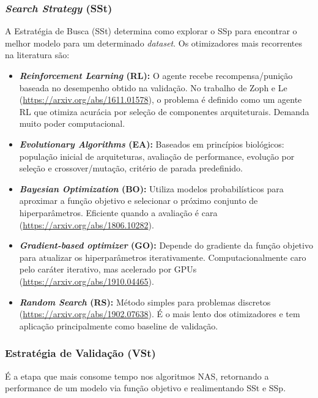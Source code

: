 \documentclass[a4paper,12pt]{article}
\begin{document}
\begin{appendices}
\subsubsection*{\textit{Search Strategy} (SSt)}
A Estratégia de Busca (SSt) determina como explorar o SSp para encontrar o melhor modelo para um determinado \textit{dataset}. Os otimizadores mais recorrentes na literatura são:

\begin{itemize}[noitemsep]
    \item \textbf{\textit{Reinforcement Learning} (RL):} O agente recebe recompensa/punição baseada no desempenho obtido na validação. No trabalho de Zoph e Le (\url{https://arxiv.org/abs/1611.01578}), o problema é definido como um agente RL que otimiza acurácia por seleção de componentes arquiteturais. Demanda muito poder computacional.

    \item \textbf{\textit{Evolutionary Algorithms} (EA):} Baseados em princípios biológicos: população inicial de arquiteturas, avaliação de performance, evolução por seleção e crossover/mutação, critério de parada predefinido.

    \item \textbf{\textit{Bayesian Optimization} (BO):} Utiliza modelos probabilísticos para aproximar a função objetivo e selecionar o próximo conjunto de hiperparâmetros. Eficiente quando a avaliação é cara (\url{https://arxiv.org/abs/1806.10282}).

    \item \textbf{\textit{Gradient-based optimizer} (GO):} Depende do gradiente da função objetivo para atualizar os hiperparâmetros iterativamente. Computacionalmente caro pelo caráter iterativo, mas acelerado por GPUs (\url{https://arxiv.org/abs/1910.04465}).

    \item \textbf{\textit{Random Search} (RS):} Método simples para problemas discretos (\url{https://arxiv.org/abs/1902.07638}). É o mais lento dos otimizadores e tem aplicação principalmente como baseline de validação.
\end{itemize}

\subsubsection*{Estratégia de Validação (VSt)}

É a etapa que mais consome tempo nos algoritmos NAS, retornando a performance de um modelo via função objetivo e realimentando SSt e SSp.


\end{appendices}
\end{document}

